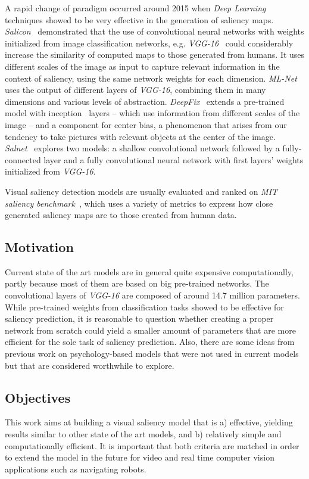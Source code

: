 \documentclass[10pt,twocolumn,letterpaper]{article}
\begin{document}
A rapid change of paradigm occurred around 2015 when \emph{Deep Learning}
techniques showed to be very effective in the generation of saliency
maps.
\emph{Salicon}~\cite{jiang_2015} demonstrated that the use of
convolutional neural networks with weights initialized from
image classification networks, e.g. \emph{VGG-16}~\cite{zisserman_2014}
could considerably increase the similarity of computed maps to those
generated from humans.
It uses different scales of the image as input to capture relevant
information in the context of saliency, using the same network weights
for each dimension.
\emph{ML-Net}~\cite{cornia_2016} uses the output of different layers
of \emph{VGG-16}, combining them in many dimensions and various levels of
abstraction.
\emph{DeepFix}~\cite{kruthiventi_2015} extends a pre-trained model with
inception~\cite{szegedy_2014} layers -- which use information from different
scales of the image -- and a component for center bias, a
phenomenon that arises from our tendency to take pictures with relevant
objects at the center of the image.
\emph{Salnet}~\cite{pan_2016} explores two models: a shallow convolutional
network followed by a fully-connected layer and a fully convolutional
neural network with first layers' weights initialized from \emph{VGG-16}.

Visual saliency detection models are usually evaluated and ranked on
\emph{MIT saliency benchmark}~\cite{mit_sal_bm}, which uses a variety of
metrics to express how close generated saliency maps are to those created
from human data.

\subsection{Motivation}
Current state of the art models are in general quite expensive computationally,
partly because most of them are based on big pre-trained networks.
The convolutional layers of \emph{VGG-16} are composed of around 14.7
million parameters.
While pre-trained weights from classification tasks showed to be effective
for saliency prediction, it is reasonable to question whether
creating a proper network from scratch could yield a smaller amount of
parameters that are more efficient for the sole task of saliency prediction.
Also, there are some ideas from previous work on psychology-based models that
were not used in current models but that are considered worthwhile to explore.

\subsection{Objectives}
This work aims at building a visual saliency model that is a) effective,
yielding results similar to other state of the art models,
and b) relatively simple and computationally efficient.
It is important that both criteria are matched in order to extend the
model in the future for video and real time computer vision applications
such as navigating robots.
\end{document}
